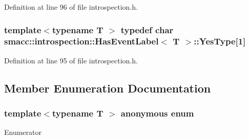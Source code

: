 Definition at line 96 of file introspection.\+h.

\subsubsection[{\texorpdfstring{Yes\+Type}{YesType}}]{\setlength{\rightskip}{0pt plus 5cm}template$<$typename T $>$ typedef char {\bf smacc\+::introspection\+::\+Has\+Event\+Label}$<$ T $>$\+::Yes\+Type\mbox{[}1\mbox{]}\hspace{0.3cm}{\ttfamily [private]}}\hypertarget{classsmacc_1_1introspection_1_1HasEventLabel_a8d4b4c2ecb640812e11e8c1407636b6a}{}\label{classsmacc_1_1introspection_1_1HasEventLabel_a8d4b4c2ecb640812e11e8c1407636b6a}


Definition at line 95 of file introspection.\+h.



\subsection{Member Enumeration Documentation}
\subsubsection[{\texorpdfstring{anonymous enum}{anonymous enum}}]{\setlength{\rightskip}{0pt plus 5cm}template$<$typename T $>$ anonymous enum}\hypertarget{classsmacc_1_1introspection_1_1HasEventLabel_a2de6073f80d42739c5ed78d301bd853b}{}\label{classsmacc_1_1introspection_1_1HasEventLabel_a2de6073f80d42739c5ed78d301bd853b}
\begin{Desc}
\item[Enumerator]\par
\begin{description}
\item[{\em 
value\hypertarget{classsmacc_1_1introspection_1_1HasEventLabel_a2de6073f80d42739c5ed78d301bd853ba3f57db3ac5b424aedec54eb89e48b732}{}\label{classsmacc_1_1introspection_1_1HasEventLabel_a2de6073f80d42739c5ed78d301bd853ba3f57db3ac5b424aedec54eb89e48b732}
}]\end{description}
\end{Desc}


